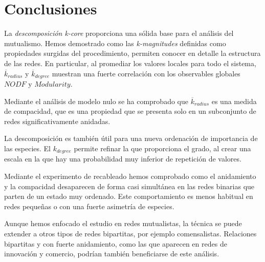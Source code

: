\section{Conclusiones}

La \textit{descomposición k-core} proporciona una sólida base para el análisis del mutualismo. Hemos demostrado como las \textit{k-magnitudes} definidas como propiedades surgidas del procedimiento, permiten conocer en detalle la estructura de las redes. En particular, al promediar los valores locales para todo el sistema, $\overline {k}_{radius}$ y $\overline {k}_{degree}$ muestran una fuerte correlación con los observables globales $NODF$ y $Modularity$. 

Mediante el análisis de modelo nulo se ha comprobado que $\overline {k}_{radius}$ es una medida de compacidad, que es una propiedad que se presenta solo en un subconjunto de redes significativamente anidadas.

La descomposición es también útil para una nueva ordenación de importancia de las especies. El ${k}_{degree}$ permite refinar la que proporciona el grado, al crear una escala en la que hay una probabilidad muy inferior de repetición de valores.

Mediante el experimento de recableado hemos comprobado como el anidamiento y la compacidad desaparecen de forma casi simultánea en las redes binarias que parten de un estado muy ordenado. Este comportamiento es menos habitual en redes pequeñas o con una fuerte asimetría de especies.

Aunque hemos enfocado el estudio en redes mutualistas, la técnica se puede extender a otros tipos de redes bipartitas, por ejemplo comensalistas. Relaciones bipartitas y con fuerte anidamiento, como las que aparecen en redes de innovación y comercio, podrían también beneficiarse de este análisis.

\clearpage
